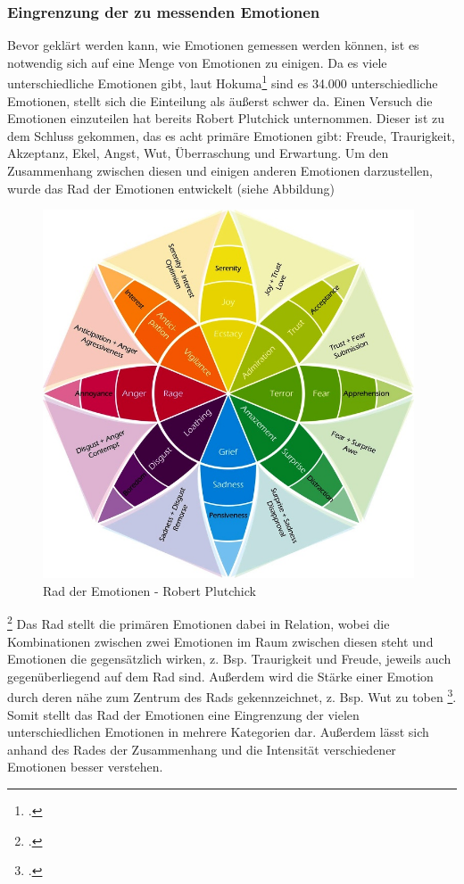 \subsubsection{Eingrenzung der zu messenden Emotionen}
Bevor geklärt werden kann, wie Emotionen gemessen werden können, ist es notwendig sich auf eine Menge von Emotionen zu einigen. Da es viele unterschiedliche Emotionen gibt, laut Hokuma\footcite[Vgl.][Absch. 1]{Hok17} sind es 34.000 unterschiedliche Emotionen, stellt sich die Einteilung als äußerst schwer da. Einen Versuch die Emotionen einzuteilen hat bereits Robert Plutchick unternommen. Dieser ist zu dem Schluss gekommen, das es acht primäre Emotionen gibt: Freude, Traurigkeit, Akzeptanz, Ekel, Angst, Wut, Überraschung und Erwartung. Um den Zusammenhang zwischen diesen und einigen anderen Emotionen darzustellen, wurde das Rad der Emotionen entwickelt (siehe Abbildung)\newline
\begin{figure}[h]
	\centering
	\includegraphics[width=11cm]{Bilder/wheel-of-emotions.png}
	\caption[Rad der Emotionen - Robert Plutchick]{Rad der Emotionen - Robert Plutchick\footnotemark}
\end{figure}%
\footcitetext[Vgl.][]{Hok17}
\newline
Das Rad stellt die primären Emotionen dabei in Relation, wobei die Kombinationen zwischen zwei Emotionen im Raum zwischen diesen steht und Emotionen die gegensätzlich wirken, z. Bsp. Traurigkeit und Freude, jeweils auch gegenüberliegend auf dem Rad sind. Außerdem wird die Stärke einer Emotion durch deren nähe zum Zentrum des Rads gekennzeichnet, z. Bsp. Wut zu toben \footcite[Vgl.][Absch. Elements of the Wheel]{Hok17}.\newline
Somit stellt das Rad der Emotionen eine Eingrenzung der vielen unterschiedlichen Emotionen in mehrere Kategorien dar. Außerdem lässt sich anhand des Rades der Zusammenhang und die Intensität verschiedener Emotionen besser verstehen. 
